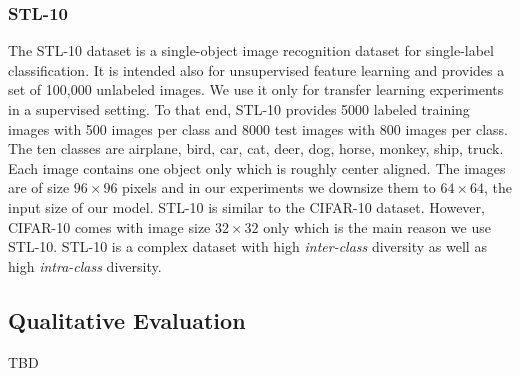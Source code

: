 \documentclass[12pt,a4paper]{article}
\begin{document}
\subsubsection{STL-10}
The STL-10 \cite{singleLayerNetworks} dataset is a single-object image recognition dataset for single-label classification. It is intended also for unsupervised feature learning and provides a set of 100,000 unlabeled images. We use it only for transfer learning experiments in a supervised setting. To that end, STL-10 provides 5000 labeled training images with 500 images per class and 8000 test images with 800 images per class. The ten classes are airplane, bird, car, cat, deer, dog, horse, monkey, ship, truck. Each image contains one object only which is roughly center aligned. The images are of size $96 \times 96$ pixels and in our experiments we downsize them to $64 \times 64$, the input size of our model. STL-10 is similar to the CIFAR-10 dataset. However, CIFAR-10 comes with image size $32 \times 32$ only which is the main reason we use STL-10. STL-10 is a complex dataset with high \textit{inter-class} diversity as well as high \textit{intra-class} diversity.


\subsection{Qualitative Evaluation}
TBD
\end{document}
